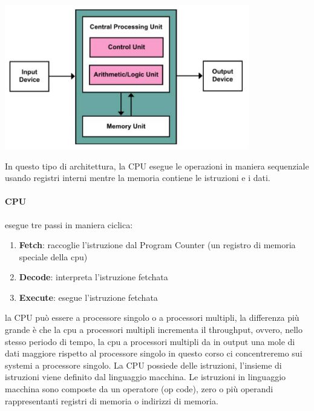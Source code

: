 \documentclass{article}
\begin{document}
    {\centering \includegraphics[width=0.8\textwidth]{immagini/architettura von neuman.png}}

    In questo tipo di architettura, la CPU esegue le operazioni in maniera sequenziale usando registri interni mentre la memoria contiene le istruzioni e i dati.
    \paragraph{CPU} esegue tre passi in maniera ciclica:
    \begin{enumerate}
        \item \textbf{Fetch}: raccoglie l'istruzione dal Program Counter (un registro di memoria speciale della cpu)
        \item \textbf{Decode}: interpreta l'istruzione fetchata
        \item \textbf{Execute}: esegue l'istruzione fetchata
    \end{enumerate}
    la CPU può essere a processore singolo o a processori multipli, la differenza più grande è che la cpu a processori multipli incrementa il throughput, ovvero, nello stesso periodo di tempo, la cpu a processori multipli da in output una mole di dati maggiore rispetto al processore singolo in questo corso ci concentreremo sui systemi a processore singolo. La CPU possiede delle istruzioni, l'insieme di istruzioni viene definito dal linguaggio macchina. Le istruzioni in linguaggio macchina sono composte da un operatore (op code), zero o più operandi rappresentanti registri di memoria o indirizzi di memoria.
\end{document}
